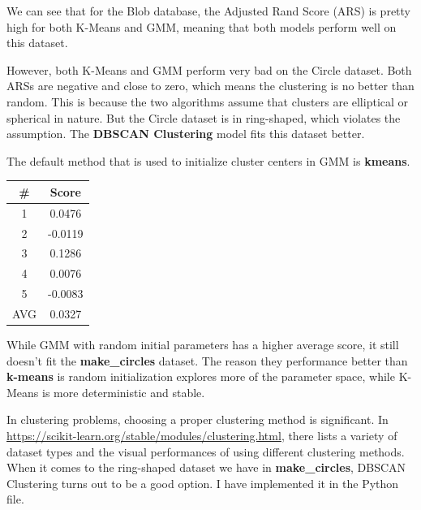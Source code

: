 \begin{solution}
    We can see that for the Blob database, the Adjusted Rand Score (ARS) is pretty high for both K-Means and GMM, meaning that both models perform well on this dataset.

    However, both K-Means and GMM perform very bad on the Circle dataset.
    Both ARSs are negative and close to zero, which means the clustering is no better than random.
    This is because the two algorithms assume that clusters are elliptical or spherical in nature.
    But the Circle dataset is in ring-shaped, which violates the assumption.
    The \textbf{DBSCAN Clustering} model fits this dataset better.

     The default method that is used to initialize cluster centers in GMM is \textbf{kmeans}.

    \begin{center}
        \begin{tabular}{ c c }
            \hline
            \#  & Score   \\
            \hline
            1   & 0.0476  \\
            2   & -0.0119 \\
            3   & 0.1286  \\
            4   & 0.0076  \\
            5   & -0.0083 \\
            \hline
            AVG & 0.0327  \\
            \hline
        \end{tabular}
    \end{center}

    While GMM with random initial parameters has a higher average score, it still doesn't fit the \textbf{make\_circles} dataset.
    The reason they performance better than \textbf{k-means} is random initialization explores more of the parameter space, while K-Means is more deterministic and stable.

     In clustering problems, choosing a proper clustering method is significant.
    In \url{https://scikit-learn.org/stable/modules/clustering.html}, there lists a variety of dataset types and the visual performances of using different clustering methods.
    When it comes to the ring-shaped dataset we have in \textbf{make\_circles}, DBSCAN Clustering turns out to be a good option.
    I have implemented it in the Python file.
\end{solution}